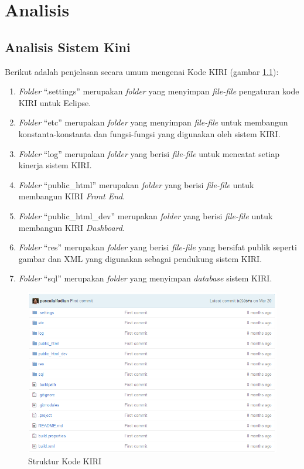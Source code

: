 \chapter{Analisis}
\label{chap:analisis}

\section{Analisis Sistem Kini}
\label{sec:analisissistemkini}
Berikut adalah penjelasan secara umum mengenai Kode KIRI (gambar \ref{fig:3_strukturkiri}):
\begin{enumerate}
	\item \textit{Folder} ``.settings'' merupakan \textit{folder} yang menyimpan \textit{file-file} pengaturan kode KIRI untuk Eclipse.
	\item \textit{Folder} ``etc'' merupakan \textit{folder} yang menyimpan \textit{file-file} untuk membangun konstanta-konstanta dan fungsi-fungsi yang digunakan oleh sistem KIRI.
	\item \textit{Folder} ``log'' merupakan \textit{folder} yang berisi \textit{file-file} untuk mencatat setiap kinerja sistem KIRI.
	\item \textit{Folder} ``public\_html'' merupakan \textit{folder} yang berisi \textit{file-file} untuk membangun KIRI \textit{Front End}.
	\item \textit{Folder} ``public\_html\_dev'' merupakan \textit{folder} yang berisi \textit{file-file} untuk membangun KIRI \textit{Dashboard}.
	\item \textit{Folder} ``res'' merupakan \textit{folder} yang berisi \textit{file-file} yang bersifat publik seperti gambar dan XML yang digunakan sebagai pendukung sistem KIRI.
	\item \textit{Folder} ``sql'' merupakan \textit{folder} yang menyimpan \textit{database} sistem KIRI.
\end{enumerate}

\begin{figure}[htbp]
	\centering
		\includegraphics[scale=0.5]{Gambar/3_strukturkiri.png}
	\caption{Struktur Kode KIRI}
	\label{fig:3_strukturkiri}
\end{figure}

